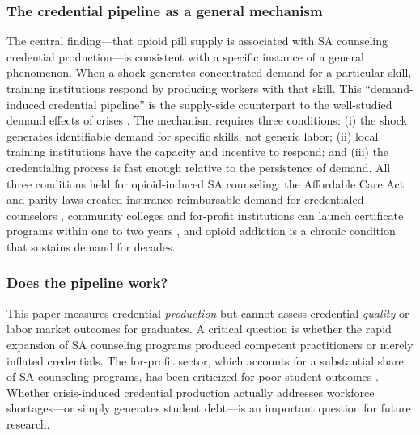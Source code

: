 \documentclass[12pt]{article}
\begin{document}
\subsubsection*{The credential pipeline as a general mechanism} The central finding---that opioid pill supply is associated with SA counseling credential production---is consistent with a specific instance of a general phenomenon. When a shock generates concentrated demand for a particular skill, training institutions respond by producing workers with that skill. This ``demand-induced credential pipeline'' is the supply-side counterpart to the well-studied demand effects of crises \citep{autor2019}. The mechanism requires three conditions: (i) the shock generates identifiable demand for specific skills, not generic labor; (ii) local training institutions have the capacity and incentive to respond; and (iii) the credentialing process is fast enough relative to the persistence of demand. All three conditions held for opioid-induced SA counseling: the Affordable Care Act and parity laws created insurance-reimbursable demand for credentialed counselors \citep{barry2010}, community colleges and for-profit institutions can launch certificate programs within one to two years \citep{cellini2010}, and opioid addiction is a chronic condition that sustains demand for decades.

\subsubsection*{Does the pipeline work?} This paper measures credential \textit{production} but cannot assess credential \textit{quality} or labor market outcomes for graduates. A critical question is whether the rapid expansion of SA counseling programs produced competent practitioners or merely inflated credentials. The for-profit sector, which accounts for a substantial share of SA counseling programs, has been criticized for poor student outcomes \citep{deming2012, cellini2020}. Whether crisis-induced credential production actually addresses workforce shortages---or simply generates student debt---is an important question for future research.
\end{document}
